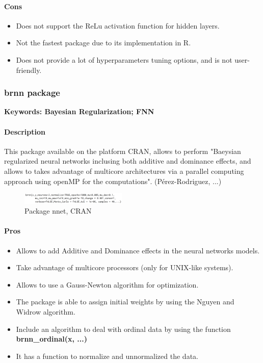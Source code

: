 \documentclass[6pt,letter]{article}\usepackage[]{graphicx}\usepackage[]{color}
\begin{document}
\paragraph{Cons}
\begin{itemize}
\item Does not support the ReLu activation function for hidden layers.
\item Not the fastest package due to its implementation in R.
\item Does not provide a lot of hyperparameters tuning options, and is not user-friendly.
\end{itemize}



\subsubsection{brnn package}
\textbf{Keywords: Bayesian Regularization; FNN}
\paragraph{Description}
This package available on the platform CRAN, allows to perform "Baeysian regularized neural networks inclusing both additive and dominance effects, and allows to takes advantage of multicore architectures via a parallel computing approach using openMP for the computations". (Pérez-Rodriguez, ...)
\begin{figure}[h]
    \centering
    \includegraphics[width=0.45\textwidth]{figure/brnn_package.png}
     \caption{Package nnet, CRAN}
\end{figure}
\paragraph{Pros}
\begin{itemize}
\item Allows to add Additive and Dominance effects in the neural networks models.
\item Take advantage of multicore processors (only for UNIX-like systems).
\item Allows to use a Gauss-Newton algorithm for optimization.
\item The package is able to assign initial weights by using the Nguyen and Widrow algorithm.
\item Include an algorithm to deal with ordinal data by using the function \textbf{brnn\_ordinal(x, ...)}
\item It has a function to normalize and unnormalized the data.
\end{itemize}
\end{document}
